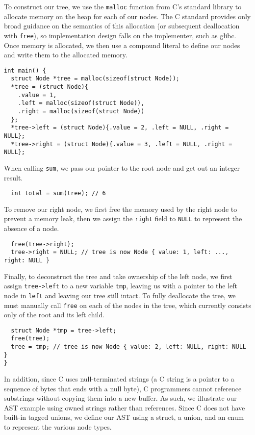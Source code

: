 \documentclass[12pt, letterpaper]{article}
\begin{document}
To construct our tree, we use the \texttt{malloc} function from C's standard library to allocate memory on the heap for each of our nodes. The C standard provides only broad guidance on the semantics of this allocation (or subsequent deallocation with \texttt{free}), so implementation design falls on the implementer, such as glibc.\autocite[\S~7.24.3]{c-standard} Once memory is allocated, we then use a compound literal to define our nodes and write them to the allocated memory.\autocite[\S~6.5.3.6]{c-standard}
\begin{verbatim}
int main() {
  struct Node *tree = malloc(sizeof(struct Node));
  *tree = (struct Node){
    .value = 1,
    .left = malloc(sizeof(struct Node)),
    .right = malloc(sizeof(struct Node))
  };
  *tree->left = (struct Node){.value = 2, .left = NULL, .right = NULL};
  *tree->right = (struct Node){.value = 3, .left = NULL, .right = NULL};
\end{verbatim}

When calling \texttt{sum}, we pass our pointer to the root node and get out an integer result.
\begin{verbatim}
  int total = sum(tree); // 6
\end{verbatim}

To remove our right node, we first free the memory used by the right node to prevent a memory leak, then we assign the \texttt{right} field to \texttt{NULL} to represent the absence of a node.\autocite[\S~7.24.3.3]{c-standard}
\begin{verbatim}
  free(tree->right);
  tree->right = NULL; // tree is now Node { value: 1, left: ..., right: NULL }
\end{verbatim}

Finally, to deconstruct the tree and take ownership of the left node, we first assign \texttt{tree->left} to a new variable \texttt{tmp}, leaving us with a pointer to the left node in \texttt{left} and leaving our tree still intact. To fully deallocate the tree, we must manually call \texttt{free} on each of the nodes in the tree, which currently consists only of the root and its left child.
\begin{verbatim}
  struct Node *tmp = tree->left;
  free(tree);
  tree = tmp; // tree is now Node { value: 2, left: NULL, right: NULL }
}
\end{verbatim}

In addition, since C uses null-terminated strings (a C string is a pointer to a sequence of bytes that ends with a null byte), C programmers cannot reference substrings without copying them into a new buffer. As such, we illustrate our AST example using owned strings rather than references.\autocite[\S~7.1.1]{c-standard} Since C does not have built-in tagged unions, we define our AST using a struct, a union, and an enum to represent the various node types.
\end{document}
